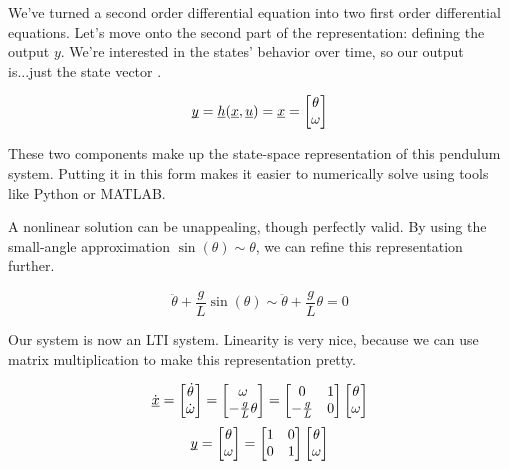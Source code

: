 \documentclass{report}
\begin{document}
\begin{onehalfspacing}
\begin{flushleft}
We've turned a second order differential equation into two first order differential equations. Let's move onto the second part of the representation: defining the output \(y\). We're interested in the states' behavior over time, so our output is...just the state vector .

\[\underbar{\(y\)} = \underbar{\(h\)}(\underbar{\(x\)}, \underbar{\(u\)}) = \underbar{\(x\)} = \begin{bmatrix}
    \theta \\
    \omega  \end{bmatrix}\]

These two components make up the state-space representation of this pendulum system. Putting it in this form makes it easier to numerically solve using tools like Python or MATLAB.

\medskip

A nonlinear solution can be unappealing, though perfectly valid. By using the small-angle approximation \(\sin(\theta) \sim \theta\), we can refine this representation further.

\[\ddot{\theta} + \frac{g}{L} \sin(\theta) \sim \ddot{\theta} + \frac{g}{L} \theta = 0\]

Our system is now an LTI system. Linearity is very nice, because we can use matrix multiplication to make this representation pretty.

\vspace{-0.1in}
\[\dot{\underbar{\(x\)}} = \begin{bmatrix}
    \dot{\theta} \\
    \dot{\omega}  \end{bmatrix} = \begin{bmatrix}
    \omega \\
    -\frac{g}{L} \theta
\end{bmatrix} = \begin{bmatrix}
    0 & 1\\
    -\frac{g}{L} & 0
\end{bmatrix} \begin{bmatrix}
    \theta \\
    \omega  \end{bmatrix}\]
\[\underbar{\(y\)} = \begin{bmatrix}
    \theta \\
    \omega  \end{bmatrix} = \begin{bmatrix}
        1 & 0\\
        0 & 1
    \end{bmatrix} \begin{bmatrix}
        \theta \\
        \omega  \end{bmatrix}\]


\end{flushleft}
\end{onehalfspacing}
\end{document}
